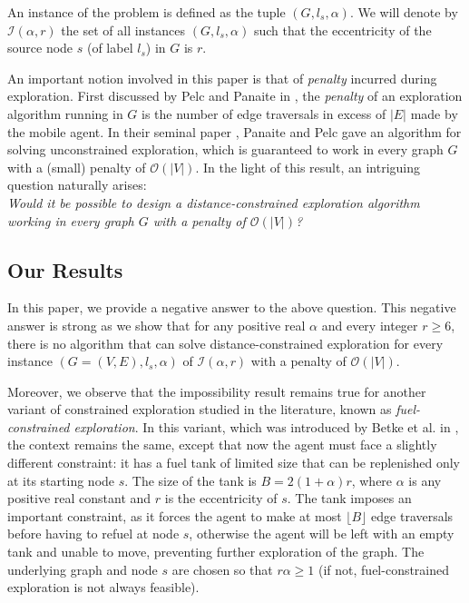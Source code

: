 \documentclass[11pt]{article}
\begin{document}
An instance of the problem is defined as the tuple $(G,l_s,\alpha)$. We will denote by $\mathcal{I}(\alpha,r)$ the set of all instances $(G,l_s,\alpha)$ such that the eccentricity of the source node $s$ (of label $l_s$) in $G$ is $r$. 

An important notion involved in this paper is that of \emph{penalty}
incurred during exploration. First discussed by Pelc and Panaite in
\cite{PanaiteP99}, the \emph{penalty} of an exploration algorithm
running in $G$ is the number of edge traversals in excess of
$|E|$ made by the  mobile agent. In their seminal paper
\cite{PanaiteP99}, Panaite and Pelc gave an algorithm for solving
unconstrained exploration, which is guaranteed to work in every graph
$G$ with a (small) penalty of $\mathcal{O}(|V|)$. In the light of this result, an intriguing question naturally arises: \\

{\it Would it be possible to design a distance-constrained exploration algorithm working in every graph $G$ with a penalty of $\mathcal{O}(|V|)$?}

\subsection{Our Results}
\label{sec:ourresults}
In this paper, we provide a negative answer to the above question. This negative answer is strong as we show that for any positive real $\alpha$ and every integer $r\geq 6$, there is no algorithm that can solve distance-constrained exploration for every instance $(G=(V,E),l_s,\alpha)$ of $\mathcal{I}(\alpha,r)$ with a penalty of $\mathcal{O}(|V|)$. 

Moreover, we observe that the impossibility result remains true for another variant of constrained exploration studied in the literature, known as \emph{fuel-constrained exploration}. In this variant, which was introduced by Betke et al. in \cite{BetkeRS95}, the context remains the same, except that now the agent must face a slightly different constraint: it has a fuel tank of limited size that can be replenished only at its starting node $s$. The size of the tank is $B=2(1+\alpha)r$, where $\alpha$ is any positive real constant and $r$ is the eccentricity of $s$. The tank imposes an important constraint, as it forces the agent to make at most {$\lfloor B\rfloor$} edge traversals before having to refuel at node $s$, otherwise the agent will be left with an empty tank and unable to move, preventing further exploration of the graph. The underlying graph and node $s$ are chosen so that $r\alpha\geq 1$ (if not, fuel-constrained exploration is not always feasible).
\end{document}
